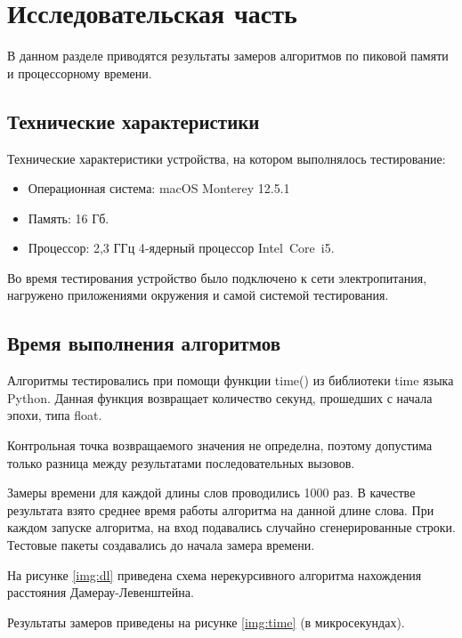 \chapter{Исследовательская часть}

В данном разделе приводятся результаты замеров алгоритмов по пиковой памяти и процессорному времени.

\section{Технические характеристики}

Технические характеристики устройства, на котором выполнялось тестирование:

\begin{itemize}
	\item Операционная система: macOS Monterey 12.5.1 
	\item Память: 16 Гб.
	\item Процессор: 2,3 ГГц 4‑ядерный процессор Intel Core i5.
\end{itemize}

Во время тестирования устройство было подключено к сети электропитания, нагружено приложениями окружения и самой  системой тестирования.

\section{Время выполнения алгоритмов}

Алгоритмы тестировались при помощи функции time() из библиотеки time языка Python. Данная функция возвращает количество секунд, прошедших с начала эпохи, типа float.

Контрольная точка возвращаемого значения не определна, поэтому допустима только разница между результатами последовательных вызовов.

Замеры времени для каждой длины слов проводились 1000 раз. В качестве результата взято среднее время работы алгоритма на данной длине слова. При каждом запуске алгоритма, на вход подавались случайно сгенерированные строки. Тестовые пакеты создавались до начала замера времени.

На рисунке \ref{img:dl} приведена схема нерекурсивного алгоритма нахождения расстояния Дамерау-Левенштейна.

Результаты замеров приведены на рисунке \ref{img:time} (в микросекундах).


